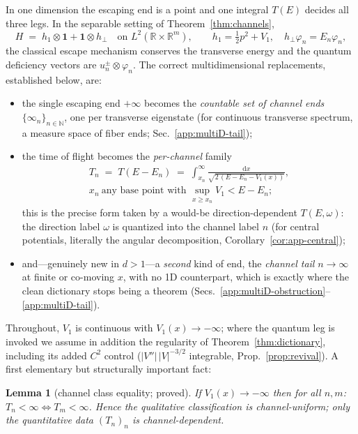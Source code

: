 \documentclass[11pt]{article}
\newtheorem{lemma}[theorem]{Lemma}
\theoremstyle{definition}
\theoremstyle{remark}
\newcommand{\dd}{\mathrm{d}}
\begin{document}
In one dimension the escaping end is a point and one integral $T(E)$
decides all three legs. In the separable setting of
Theorem~\ref{thm:channels},
\[
H \;=\; h_{1}\otimes\mathbf 1+\mathbf 1\otimes h_{\perp}
\quad\text{on } L^{2}(\mathbb R\times\mathbb R^{m}),
\qquad h_{1}=\tfrac12p^{2}+V_{1},\quad
h_{\perp}\varphi_{n}=E_{n}\varphi_{n},
\]
the classical escape mechanism conserves the transverse energy and the
quantum deficiency vectors are $u_{n}^{\pm}\otimes\varphi_{n}$. The
correct multidimensional replacements, established below, are:
\begin{itemize}
\item the single escaping end $+\infty$ becomes the \emph{countable set
of channel ends} $\{\infty_{n}\}_{n\in\mathbb N}$, one per transverse
eigenstate (for continuous transverse spectrum, a measure space of
fiber ends; Sec.~\ref{app:multiD-tail});
\item the time of flight becomes the \emph{per-channel} family
\[
\begin{gathered}
T_{n}\;=\;T(E-E_{n})
\;=\;\int_{x_{n}}^{\infty}\frac{\dd x}{\sqrt{2\,(E-E_{n}-V_{1}(x))}},\\
x_{n}\ \text{any base point with }\sup_{x\ge x_{n}}V_{1}<E-E_{n};
\end{gathered}
\]
this is the precise form taken by a would-be direction-dependent
$T(E,\omega)$: the direction label $\omega$ is quantized into the
channel label $n$ (for central potentials, literally the angular
decomposition, Corollary~\ref{cor:app-central});
\item and---genuinely new in $d>1$---a \emph{second} kind of end, the
\emph{channel tail} $n\to\infty$ at finite or co-moving $x$, with no 1D
counterpart, which is exactly where the clean dictionary stops being a
theorem (Secs.~\ref{app:multiD-obstruction}--\ref{app:multiD-tail}).
\end{itemize}
Throughout, $V_{1}$ is continuous with $V_{1}(x)\to-\infty$; where the
quantum leg is invoked we assume in addition the regularity of
Theorem~\ref{thm:dictionary}, including its added $C^{2}$ control
($|V''|\,|V|^{-3/2}$ integrable, Prop.~\ref{prop:revival}). A first elementary but structurally
important fact:

\begin{lemma}[channel class equality; proved]\label{lem:app-classeq}
If $V_{1}(x)\to-\infty$ then for all $n,m$:
$T_{n}<\infty\iff T_{m}<\infty$. Hence the \emph{qualitative}
classification is channel-uniform; only the \emph{quantitative} data
$(T_{n})_{n}$ is channel-dependent.
\end{lemma}
\end{document}
